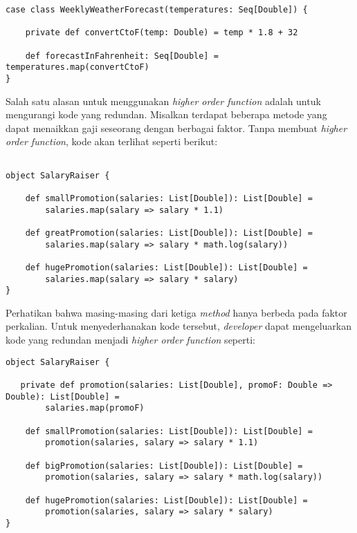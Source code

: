 \begin{verbatim}
case class WeeklyWeatherForecast(temperatures: Seq[Double]) {

    private def convertCtoF(temp: Double) = temp * 1.8 + 32 

    def forecastInFahrenheit: Seq[Double] = temperatures.map(convertCtoF) 
}
\end{verbatim}


Salah satu alasan untuk menggunakan \textit{higher order function} adalah untuk mengurangi kode yang redundan. Misalkan terdapat beberapa metode yang dapat menaikkan gaji seseorang dengan berbagai faktor. Tanpa membuat \textit{higher order function}, kode akan terlihat seperti berikut:

\begin{verbatim}

object SalaryRaiser {

    def smallPromotion(salaries: List[Double]): List[Double] =
        salaries.map(salary => salary * 1.1)

  	def greatPromotion(salaries: List[Double]): List[Double] =
        salaries.map(salary => salary * math.log(salary))

  	def hugePromotion(salaries: List[Double]): List[Double] =
        salaries.map(salary => salary * salary)
}
\end{verbatim}

Perhatikan bahwa masing-masing dari ketiga \textit{method} hanya berbeda pada faktor perkalian. Untuk menyederhanakan kode tersebut, \textit{developer} dapat mengeluarkan kode yang redundan menjadi \textit{higher order function} seperti:

\begin{verbatim}
object SalaryRaiser {

   private def promotion(salaries: List[Double], promoF: Double => Double): List[Double] =
        salaries.map(promoF)  

  	def smallPromotion(salaries: List[Double]): List[Double] =
        promotion(salaries, salary => salary * 1.1)

  	def bigPromotion(salaries: List[Double]): List[Double] =
        promotion(salaries, salary => salary * math.log(salary))

  	def hugePromotion(salaries: List[Double]): List[Double] =
        promotion(salaries, salary => salary * salary)
}
\end{verbatim}





